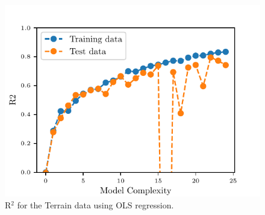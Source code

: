 \documentclass[reprint, english, nofootinbib]{revtex4-2}
\begin{document}
    \begin{figure}[h!tb]
       \center
       \includegraphics[width=\columnwidth]{R2_terrain_data.pdf}
       \caption{R$^2$ for the Terrain data using OLS regression.}
    \end{figure}
\end{document}
